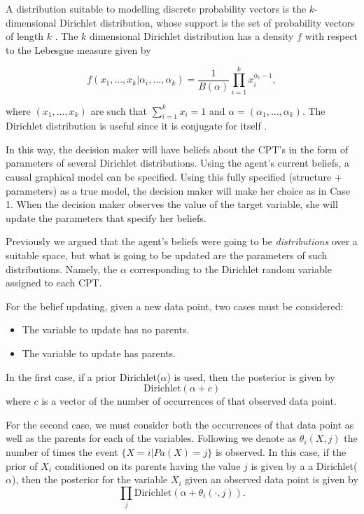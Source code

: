 \documentclass{article}
\begin{document}
A distribution suitable to modelling discrete probability vectors is the $k$-dimensional Dirichlet distribution, whose support is the set of probability vectors of length $k$ \cite{hjort2010bayesian}. The $k$ dimensional Dirichlet distribution has a density $f$ with respect to the Lebesgue measure given by

\[ f(x_1,...,x_k | \alpha_i,...,\alpha_k)=\frac{1}{B(\alpha)}  \prod_{i=1}^k x_i^{\alpha_i-1},\]

where $(x_1,...,x_k)$ are such that $\sum_{i=1}^k x_i =1$ and $\alpha=(\alpha_1,...,\alpha_k)$. The Dirichlet distribution is useful since it is conjugate for itself \cite{bernardo2000bayesian}.

In this way, the decision maker will have beliefs about the CPT's in the form of parameters of several Dirichlet distributions. Using the agent's current beliefs, a causal graphical model can be specified. Using this fully specified (structure + parameters) as a true model, the decision maker will make her choice as in Case 1. When the decision maker observes the value of the target variable, she will update the parameters that specify her beliefs.

Previously we argued that the agent's beliefs were going to be \textit{distributions} over a suitable space, but what is going to be updated are the parameters of such distributions. Namely, the $\alpha$ corresponding to the Dirichlet random variable assigned to each CPT.

For the belief updating, given a new data point,  two cases must be considered:
\begin{itemize}
\item The variable to update has no parents.
\item The variable to update has parents.
\end{itemize}

In the first case, if a prior Dirichlet($\alpha$) is used, then the posterior is given by
\[ \textrm{Dirichlet}(\alpha + c) \]
where $c$ is a vector of the number of occurrences of that observed data point. 

For the second case, we must consider both the occurrences of that data point as well as the parents for each of the variables. Following \cite{barber2012bayesian} we denote as $\theta_i(X,j)$ the number of times the event $\{X=i | Pa(X)=j\}$ is observed. In this case, if the prior of $X_i$ conditioned on its parents having the value $j$ is given by a a Dirichlet($\alpha$), then the posterior for the variable $X_i$ given an observed data point is given by 
\[ \prod_j \textrm{Dirichlet}(\alpha + \theta_i(\cdot,j)). \]
\end{document}
